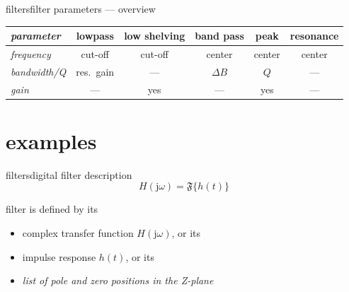         \begin{frame}{filters}{filter parameters --- overview}
            \begin{footnotesize}
            \begin{table}%
            \begin{tabular}{l|ccccc}
                \textit{parameter} & \textbf{lowpass} & \textbf{low shelving} & \textbf{band pass} & \textbf{peak} & \textbf{resonance}\\ \hline
                \textit{frequency} &cut-off&cut-off&center&center&center\\
                \textit{bandwidth/Q} &res.\ gain&---&$\Delta B$& $Q$ &---\\
                \textit{gain} &---&yes&---&yes&---
            \end{tabular}
            \end{table}
            \end{footnotesize}
        \end{frame}
        
\section{examples}	
	\begin{frame}{filters}{digital filter description}
		\begin{equation*}
			H(\mathrm{j}\omega) = \mathfrak{F}\{h(t)\}
		\end{equation*}


		filter is defined by its
		\begin{itemize}
			\item	complex transfer function $H(\mathrm{j}\omega)$, or its
			\item	impulse response $h(t)$, or its
			\item<2->	\textit{list of pole and zero positions in the Z-plane}
		\end{itemize}
	\end{frame}


